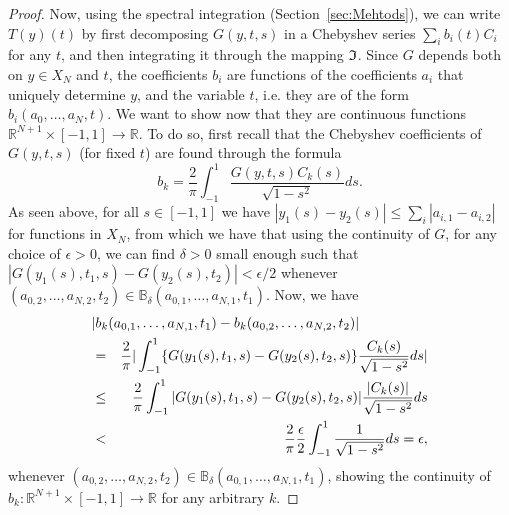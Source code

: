 \documentclass[11pt,fleqn]{amsart} %
\begin{document}
\begin{proof}
		Now, using the spectral integration (Section~\ref{sec:Mehtods}), we can write $T(y)(t)$ by first decomposing $G(y,t,s)$ in a Chebyshev series $\sum_i b_i(t)C_i$ for any $t$, and then integrating it through the mapping $\frak I$. Since $G$ depends both on $y\in X_N$ and $t$, the coefficients $b_i$ are functions of the coefficients $a_i$ that uniquely determine $y$, and the variable $t$, i.e. they are of the form $b_i(a_0, \ldots, a_N,t)$. We want to show now that they are continuous functions $\mathbb R^{N+1}\times [-1,1] \longrightarrow \mathbb R$. To do so, first recall that the Chebyshev coefficients of $G(y,t,s)$ (for fixed $t$) are found through the formula
		$$
		b_k = \frac{2}{\pi}\int_{-1}^{1} \frac{G(y,t,s)C_k(s)}{\sqrt{1-s^2}} ds.
		$$
		As seen above, for all $s\in [-1,1]$ we have $|y_1(s) - y_2(s)| \leq \sum_i |a_{i,1} - a_{i,2}|$ for functions in $X_N$, from which we have that using the continuity of $G$, for any choice of $\epsilon >0$, we can find $\delta >0$ small enough such that $|G(y_1(s),t_1,s) - G(y_2(s),t_2)| < \epsilon /2$ whenever $(a_{0,2}, \ldots , a_{N,2},t_2) \in \mathbb B_\delta (a_{0,1}, \ldots , a_{N,1},t_1)$. Now, we have
		\begin{eqnarray*}
			\lefteqn{|b_k(a_{0,1}, \ldots , a_{N,1},t_1)-b_k(a_{0,2}, \ldots , a_{N,2},t_2)|}\\
			&=& \frac{2}{\pi} |\int_{-1}^1\{G(y_1(s),t_1,s) - G(y_2(s),t_2,s)\}\frac{C_k(s)}{\sqrt{1-s^2}}ds| \\
			&\leq& \frac{2}{\pi}\int_{-1}^1 |G(y_1(s),t_1,s) - G(y_2(s),t_2,s)| \frac{|C_k(s)|}{\sqrt{1-s^2}}ds\\
			&<& \frac{2}{\pi} \frac{\epsilon}{2} \int_{-1}^1\frac{1}{\sqrt{1-s^2}}ds = \epsilon,
		\end{eqnarray*}
		whenever $(a_{0,2}, \ldots , a_{N,2},t_2) \in \mathbb B_\delta (a_{0,1}, \ldots , a_{N,1},t_1)$, showing the continuity of $b_k: \mathbb R^{N+1}\times [-1,1] \longrightarrow \mathbb R$ for any arbitrary $k$. 
		

\end{proof}
\end{document}
